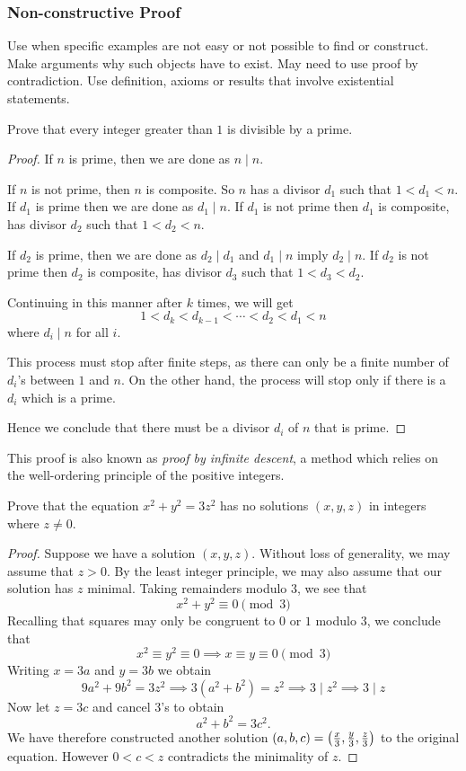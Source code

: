 \subsubsection{Non-constructive Proof}
Use when specific examples are not easy or not possible to find or construct.
Make arguments why such objects have to exist.
May need to use proof by contradiction.
Use definition, axioms or results that involve existential statements.

\begin{exercise}{}{}
Prove that every integer greater than $1$ is divisible by a prime.
\end{exercise}

\begin{proof}
If $n$ is prime, then we are done as $n\mid n$.

If $n$ is not prime, then $n$ is composite. So $n$ has a divisor $d_1$ such that $1<d_1<n$. If $d_1$ is prime then we are done as $d_1\mid n$. If $d_1$ is not prime then $d_1$ is composite, has divisor $d_2$ such that $1<d_2<n$.

If $d_2$ is prime, then we are done as $d_2\mid d_1$ and $d_1\mid n$ imply $d_2\mid n$. If $d_2$ is not prime then $d_2$ is composite, has divisor $d_3$ such that $1<d_3<d_2$.

Continuing in this manner after $k$ times, we will get
\[ 1<d_k<d_{k-1}<\cdots<d_2<d_1<n \]
where $d_i\mid n$ for all $i$.

This process must stop after finite steps, as there can only be a finite number of $d_i$'s between $1$ and $n$. On the other hand, the process will stop only if there is a $d_i$ which is a prime. 

Hence we conclude that there must be a divisor $d_i$ of $n$ that is prime.
\end{proof}

\begin{remark}
This proof is also known as \emph{proof by infinite descent}, a method which relies on the well-ordering principle of the positive integers.
\end{remark}

\begin{exercise}{}{}
Prove that the equation $x^2+y^2=3z^2$ has no solutions $(x,y,z)$ in integers where $z\neq0$.
\end{exercise}

\begin{proof}
Suppose we have a solution $(x,y,z)$. Without loss of generality, we may assume that $z>0$. By the least integer principle, we may also assume that our solution has $z$ minimal. Taking remainders modulo $3$, we see that
\[ x^2+y^2\equiv0\pmod3 \]
Recalling that squares may only be congruent to $0$ or $1$ modulo $3$, we conclude that
\[ x^2\equiv y^2\equiv 0 \implies x \equiv y \equiv 0 \pmod 3 \]
Writing $x=3a$ and $y=3b$ we obtain
\[ 9a^2+9b^2=3z^2 \implies 3(a^2+b^2)=z^2 \implies 3\mid z^2 \implies 3\mid z \]
Now let $z=3c$ and cancel $3$'s to obtain
\[ a^2+b^2=3c^2. \]
We have therefore constructed another solution $(a,b,c)=\left(\frac{x}{3},\frac{y}{3},\frac{z}{3}\right)$ to the original equation. However $0<c<z$ contradicts the minimality of $z$.
\end{proof}

